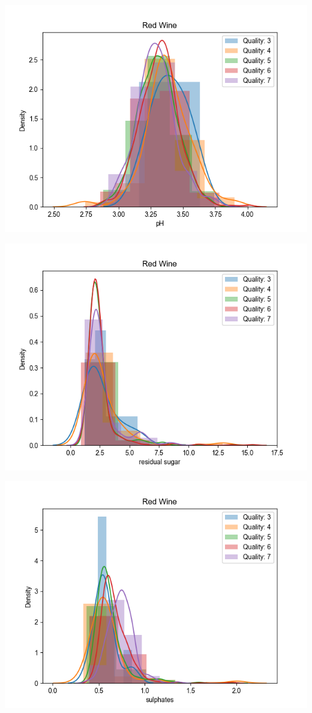 \documentclass[12pt, letterpaper]{article}
\begin{document}
\includegraphics[scale=\myscale]{red_quality_dist_pH.png}

\includegraphics[scale=\myscale]{red_quality_dist_residual_sugar.png}

\includegraphics[scale=\myscale]{red_quality_dist_sulphates.png}
\end{document}
